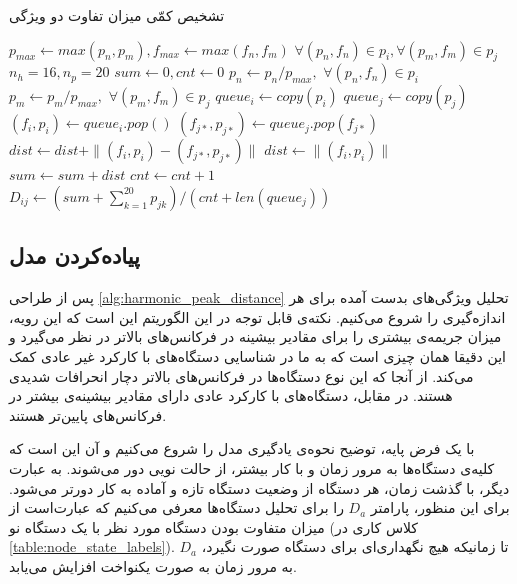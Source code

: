 \begin{algorithm}
\caption{تشخیص کمّی میزان تفاوت دو ویژگی}
\label{alg:harmonic_peak_distance}
\begin{latin}
\begin{algorithmic}
\Require $p_{max} \gets max(p_n, p_m), f_{max} \gets max(f_n, f_m)$  $\forall (p_n, f_n) \in p_i, \forall (p_m, f_m) \in p_j$
\Ensure $n_h = 16, n_p = 20$
\State $sum \gets 0, cnt \gets 0$
\State $p_n \gets p_n / p_{max},$  $\forall (p_n, f_n) \in p_i$
\State $p_m \gets p_m / p_{max},$  $\forall (p_m, f_m) \in p_j$
\State $queue_i \gets copy(p_i)$
\State $queue_j \gets copy(p_j)$
\State $(f_i, p_i) \gets queue_i.pop()$
     \State $(f_{j*}, p_{j*}) \gets queue_j.pop(f_{j*})$
     \State $dist \gets dist + \|(f_i, p_i) - (f_{j*}, p_{j*})\|$
\Else
    \State $dist \gets \|(f_i, p_i)\|$
\EndIf
	\State $sum \gets sum + dist$
	\State $cnt \gets cnt + 1$
\EndWhile
\State $D_{ij} \gets (sum + \sum_{k=1}^{20} p_{jk}) / (cnt + len(queue_j))$
\end{algorithmic}
\end{latin}
\end{algorithm}

\subsection{پیاده‌کردن مدل}
پس از طراحی \cref{alg:harmonic_peak_distance} تحلیل ویژگی‌های بدست آمده برای هر اندازه‌گیری را شروع می‌کنیم. نکته‌ی قابل توجه در این الگوریتم این است که این رویه، میزان جریمه‌ی بیشتری را برای مقادیر بیشینه در فرکانس‌های بالاتر در نظر می‌گیرد و این دقیقا همان چیزی است که به ما در شناسایی دستگاه‌های با کارکرد غیر عادی کمک می‌کند. از آنجا که این نوع دستگاه‌ها در فرکانس‌های بالاتر دچار انحرافات شدیدی هستند. در مقابل، دستگاه‌های با کارکرد عادی دارای مقادیر بیشینه‌ی بیشتر در فرکانس‌های پایین‌تر هستند.

با یک فرض پایه، توضیح نحوه‌ی یادگیری مدل را شروع می‌کنیم و آن این است که کلیه‌ی دستگاه‌ها به مرور زمان و با کار بیشتر، از حالت نویی دور می‌شوند. به عبارت دیگر، با گذشت زمان، هر دستگاه از وضعیت دستگاه تازه و آماده به کار دورتر می‌شود. برای این منظور، پارامتر $D_a$ را برای تحلیل دستگاه‌ها معرفی می‌کنیم که عبارت‌است از میزان متفاوت بودن دستگاه مورد نظر با یک دستگاه نو (کلاس کاری  در \cref{table:node_state_labels}). تا زمانیکه هیچ نگهداری‌ای برای دستگاه صورت نگیرد، $D_a$ به مرور زمان به صورت یکنواخت افزایش می‌یابد.

